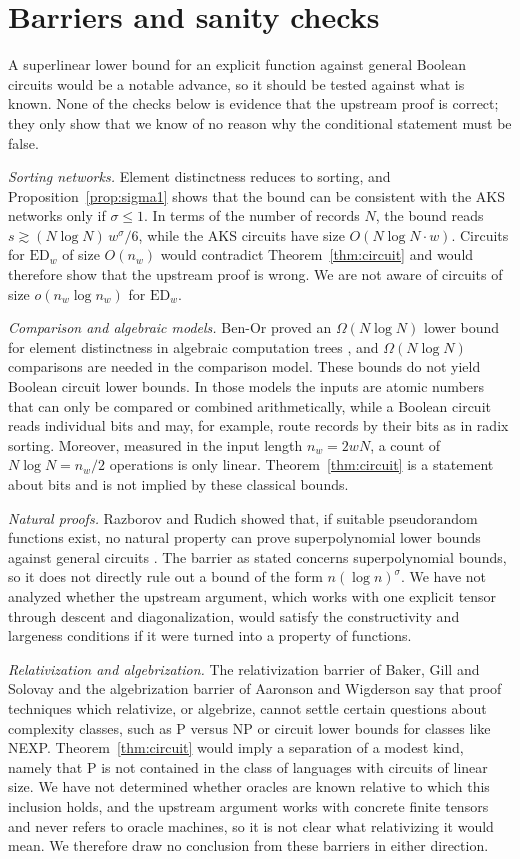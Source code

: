 \documentclass[11pt]{amsart}
\theoremstyle{definition}
\theoremstyle{remark}
\newcommand{\ED}{\mathrm{ED}}
\begin{document}
\section{Barriers and sanity checks}\label{sec:barriers}
A superlinear lower bound for an explicit function against general Boolean circuits would be a notable advance, so it should be tested against what is known. None of the checks below is evidence that the upstream proof is correct; they only show that we know of no reason why the conditional statement must be false.

\emph{Sorting networks.} Element distinctness reduces to sorting, and Proposition~\ref{prop:sigma1} shows that the bound can be consistent with the AKS networks \cite{AKS83} only if $\sigma\le 1$. In terms of the number of records $N$, the bound reads $s\gtrsim (N\log N)\,w^{\sigma}/6$, while the AKS circuits have size $O(N\log N\cdot w)$. Circuits for $\ED_w$ of size $O(n_w)$ would contradict Theorem~\ref{thm:circuit} and would therefore show that the upstream proof is wrong. We are not aware of circuits of size $o(n_w\log n_w)$ for $\ED_w$.

\emph{Comparison and algebraic models.} Ben-Or proved an $\Omega(N\log N)$ lower bound for element distinctness in algebraic computation trees \cite{BenOr83}, and $\Omega(N\log N)$ comparisons are needed in the comparison model. These bounds do not yield Boolean circuit lower bounds. In those models the inputs are atomic numbers that can only be compared or combined arithmetically, while a Boolean circuit reads individual bits and may, for example, route records by their bits as in radix sorting. Moreover, measured in the input length $n_w=2wN$, a count of $N\log N=n_w/2$ operations is only linear. Theorem~\ref{thm:circuit} is a statement about bits and is not implied by these classical bounds.

\emph{Natural proofs.} Razborov and Rudich showed that, if suitable pseudorandom functions exist, no natural property can prove superpolynomial lower bounds against general circuits \cite{RR97}. The barrier as stated concerns superpolynomial bounds, so it does not directly rule out a bound of the form $n(\log n)^{\sigma}$. We have not analyzed whether the upstream argument, which works with one explicit tensor through descent and diagonalization, would satisfy the constructivity and largeness conditions if it were turned into a property of functions.

\emph{Relativization and algebrization.} The relativization barrier of Baker, Gill and Solovay \cite{BGS75} and the algebrization barrier of Aaronson and Wigderson \cite{AW09} say that proof techniques which relativize, or algebrize, cannot settle certain questions about complexity classes, such as P versus NP or circuit lower bounds for classes like NEXP. Theorem~\ref{thm:circuit} would imply a separation of a modest kind, namely that P is not contained in the class of languages with circuits of linear size. We have not determined whether oracles are known relative to which this inclusion holds, and the upstream argument works with concrete finite tensors and never refers to oracle machines, so it is not clear what relativizing it would mean. We therefore draw no conclusion from these barriers in either direction.
\end{document}
